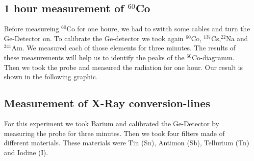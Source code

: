 \subsection{1 hour measurement of $^{60}$Co}
Before measureing $^{60}$Co for one houre, we had to switch some cables and turn the Ge-Detector on. To calibrate the Ge-detector we took again $^{60}$Co, $^{137}$Cs,$^{22}$Na and $^{241}$Am. We measured each of those elements for three minutes. The results of these measurements will help us to identify the peaks of the $^{60}$Co-diagramm. Then we took the probe and measured the radiation for one hour. Our result is shown in the following graphic.


\subsection{Measurement of X-Ray conversion-lines}
For this experiment we took Barium and calibrated the Ge-Detector by measuring the probe for three minutes. Then we took four filters made of different materials. These materials were Tin (Sn), Antimon (Sb),  Tellurium (Tn) and Iodine (I).
